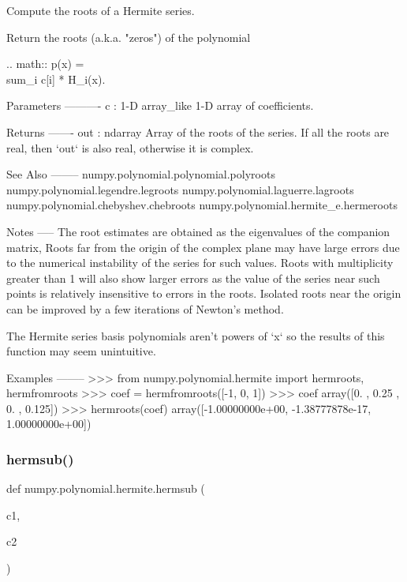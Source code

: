 \begin{DoxyVerb}Compute the roots of a Hermite series.

Return the roots (a.k.a. "zeros") of the polynomial

.. math:: p(x) = \\sum_i c[i] * H_i(x).

Parameters
----------
c : 1-D array_like
    1-D array of coefficients.

Returns
-------
out : ndarray
    Array of the roots of the series. If all the roots are real,
    then `out` is also real, otherwise it is complex.

See Also
--------
numpy.polynomial.polynomial.polyroots
numpy.polynomial.legendre.legroots
numpy.polynomial.laguerre.lagroots
numpy.polynomial.chebyshev.chebroots
numpy.polynomial.hermite_e.hermeroots

Notes
-----
The root estimates are obtained as the eigenvalues of the companion
matrix, Roots far from the origin of the complex plane may have large
errors due to the numerical instability of the series for such
values. Roots with multiplicity greater than 1 will also show larger
errors as the value of the series near such points is relatively
insensitive to errors in the roots. Isolated roots near the origin can
be improved by a few iterations of Newton's method.

The Hermite series basis polynomials aren't powers of `x` so the
results of this function may seem unintuitive.

Examples
--------
>>> from numpy.polynomial.hermite import hermroots, hermfromroots
>>> coef = hermfromroots([-1, 0, 1])
>>> coef
array([0.   ,  0.25 ,  0.   ,  0.125])
>>> hermroots(coef)
array([-1.00000000e+00, -1.38777878e-17,  1.00000000e+00])\end{DoxyVerb}
 \mbox{\label{namespacenumpy_1_1polynomial_1_1hermite_a45c79927cd8fd43a8e3319d19ac8dc17}} 
\subsubsection{\texorpdfstring{hermsub()}{hermsub()}}
{\footnotesize\ttfamily def numpy.\+polynomial.\+hermite.\+hermsub (\begin{DoxyParamCaption}\item[{}]{c1,  }\item[{}]{c2 }\end{DoxyParamCaption})}

